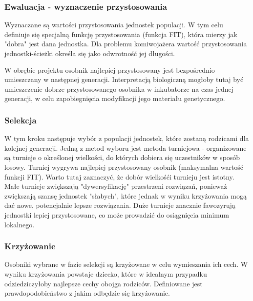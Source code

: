\documentclass[a4paper,11pt]{article}
\begin{document}
\subsubsection{Ewaluacja - wyznaczenie przystosowania}

Wyznaczane są wartości przystosowania jednostek populacji. W tym celu definiuje się specjalną funkcję przystosowania (funkcja FIT), która mierzy jak "dobra" jest dana jednostka. Dla problemu komiwojażera wartość przystosowania jednostki-ścieżki określa się jako odwrotność jej długości.

W obrębie projektu osobnik najlepiej przystosowany jest bezpośrednio umieszczany w następnej generacji. Interpretacją biologiczną mogłoby tutaj być umieszczenie dobrze przystosowanego osobnika w inkubatorze na czas jednej generacji, w celu zapobiegnięcia modyfikacji jego materiału genetycznego.

\subsubsection{Selekcja}

W tym kroku następuje wybór z populacji jednostek, które zostaną rodzicami dla kolejnej generacji. Jedną z metod wyboru jest metoda turniejowa - organizowane są turnieje o określonej wielkości, do których dobiera się uczestników w sposób losowy. Turniej wygrywa najlepiej przystosowany osobnik (maksymalna wartość funkcji FIT). Warto tutaj zaznaczyć, że dobór wielkośći turnieju jest istotny. Małe turnieje zwiększają "dywersyfikację" przestrzeni rozwiązań, ponieważ zwiększają szansę jednostek "słabych", które jednak w wyniku krzyżowania mogą dać nowe, potencjalnie lepsze rozwiązania. Duże turnieje znacznie fawozyrują jednostki lepiej przystosowane, co może prowadzić do osiągnięcia minimum lokalnego. 

\subsubsection{Krzyżowanie}

Osobniki wybrane w fazie selekcji są krzyżowane w celu wymieszania ich cech. W wyniku krzyżowania powstaje dziecko, które w idealnym przypadku odziedziczyłoby najlepsze cechy obojga rodziców. Definiowane jest prawdopodobieństwo z jakim odbędzie się krzyżowanie.
\end{document}
